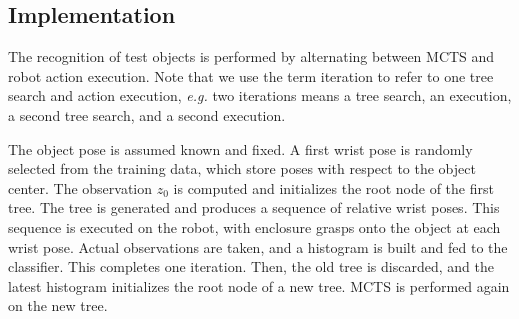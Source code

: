 \documentclass[letterpaper, 10 pt, conference]{ieeeconf}  %
\newcommand{\TODO}[1]{{\color{red}TODO: #1}}
\begin{document}

%
%


\subsection{Implementation}
\label{sec:setup}


The recognition of test objects is performed by alternating between MCTS and robot action execution. Note that we use the term iteration to refer to one tree search and action execution, \textit{e.g.} two iterations means a tree search, an execution, a second tree search, and a second execution. 


The object pose is assumed known and fixed. 
A first wrist pose is randomly selected from the training data, which store poses with respect to the object center. The observation $z_0$ is computed and initializes the root node of the first tree. 
%
The tree is generated and produces a sequence of relative wrist poses. This sequence is executed on the robot, with enclosure grasps onto the object at each wrist pose. Actual observations are taken, and a histogram is built and fed to the classifier. This completes one iteration. 
Then, the old tree is discarded, and the latest histogram initializes the root node of a new tree. MCTS is performed again on the new tree. 
\end{document}
